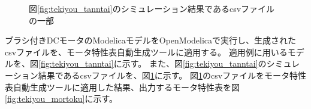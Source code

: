 \begin{figure}[t]
	\centering
	\caption{図\ref{fig:tekiyou_tanntai}のシミュレーション結果であるcsvファイルの一部}
	\label{fig:tekiyou_csv}
\end{figure}

ブラシ付きDCモータのModelicaモデルをOpenModelicaで実行し、生成されたcsvファイルを、モータ特性表自動生成ツールに適用する。
適用例に用いるモデルを、図\ref{fig:tekiyou_tanntai}に示す。
また、図\ref{fig:tekiyou_tanntai}のシミュレーション結果であるcsvファイルを、図\ref{fig:tekiyou_csv}に示す。
図\ref{fig:tekiyou_csv}のcsvファイルをモータ特性表自動生成ツールに適用した結果、出力するモータ特性表を図\ref{fig:tekiyou_mortoku}に示す。

